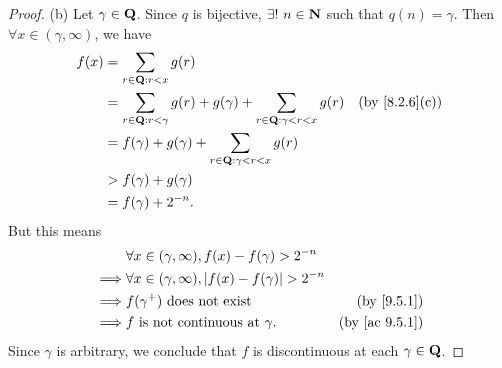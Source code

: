 \begin{proof}{(b)}
  Let \(\gamma \in \mathbf{Q}\).
  Since \(q\) is bijective, \(\exists!\ n \in \mathbf{N}\) such that \(q(n) = \gamma\).
  Then \(\forall x \in (\gamma, \infty)\), we have
  \begin{align*}
    f(x) & = \sum_{r \in \Q : r < x} g(r)                                                                                        \\
         & = \sum_{r \in \Q : r < \gamma} g(r) + g(\gamma) + \sum_{r \in \Q : \gamma < r < x} g(r) & \text{(by \cref{8.2.6}(c))} \\
         & = f(\gamma) + g(\gamma) + \sum_{r \in \Q : \gamma < r < x} g(r)                                                       \\
         & > f(\gamma) + g(\gamma)                                                                                               \\
         & = f(\gamma) + 2^{-n}.
  \end{align*}
  But this means
  \begin{align*}
             & \forall x \in (\gamma, \infty), f(x) - f(\gamma) > 2^{-n}                                     \\
    \implies & \forall x \in (\gamma, \infty), \abs{f(x) - f(\gamma)} > 2^{-n}                               \\
    \implies & f(\gamma^+) \text{ does not exist}                              & \text{(by \cref{9.5.1})}    \\
    \implies & f \text{ is not continuous at } \gamma.                         & \text{(by \cref{ac 9.5.1})}
  \end{align*}
  Since \(\gamma\) is arbitrary, we conclude that \(f\) is discontinuous at each \(\gamma \in \mathbf{Q}\).
\end{proof}

